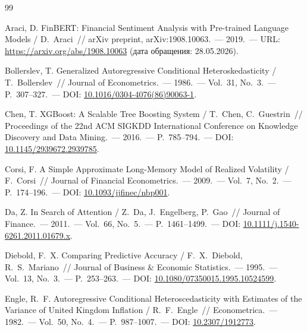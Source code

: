 \renewcommand{\refname}{Список использованных источников}

\begin{thebibliography}{99}

Araci, D.
FinBERT: Financial Sentiment Analysis with Pre-trained Language Models /
D.~Araci~// arXiv preprint, arXiv:1908.10063.~--- 2019.~---
URL: \url{https://arxiv.org/abs/1908.10063}
(дата обращения: 28.05.2026).

Bollerslev, T.
Generalized Autoregressive Conditional Heteroskedasticity /
T.~Bollerslev~// Journal of Econometrics.~--- 1986.~---
Vol.~31, No.~3.~--- P.~307--327.~---
DOI: \href{https://doi.org/10.1016/0304-4076(86)90063-1}{10.1016/0304-4076(86)90063-1}.

Chen, T.
XGBoost: A Scalable Tree Boosting System /
T.~Chen, C.~Guestrin~//
Proceedings of the 22nd ACM SIGKDD International Conference
on Knowledge Discovery and Data Mining.~--- 2016.~--- P.~785--794.~---
DOI: \href{https://doi.org/10.1145/2939672.2939785}{10.1145/2939672.2939785}.

Corsi, F.
A Simple Approximate Long-Memory Model of Realized Volatility /
F.~Corsi~// Journal of Financial Econometrics.~--- 2009.~---
Vol.~7, No.~2.~--- P.~174--196.~---
DOI: \href{https://doi.org/10.1093/jjfinec/nbp001}{10.1093/jjfinec/nbp001}.

Da, Z.
In Search of Attention /
Z.~Da, J.~Engelberg, P.~Gao~// Journal of Finance.~--- 2011.~---
Vol.~66, No.~5.~--- P.~1461--1499.~---
DOI: \href{https://doi.org/10.1111/j.1540-6261.2011.01679.x}{10.1111/j.1540-6261.2011.01679.x}.

Diebold, F.~X.
Comparing Predictive Accuracy /
F.~X.~Diebold, R.~S.~Mariano~//
Journal of Business \& Economic Statistics.~--- 1995.~---
Vol.~13, No.~3.~--- P.~253--263.~---
DOI: \href{https://doi.org/10.1080/07350015.1995.10524599}{10.1080/07350015.1995.10524599}.

Engle, R.~F.
Autoregressive Conditional Heteroscedasticity with Estimates of the
Variance of United Kingdom Inflation /
R.~F.~Engle~// Econometrica.~--- 1982.~---
Vol.~50, No.~4.~--- P.~987--1007.~---
DOI: \href{https://doi.org/10.2307/1912773}{10.2307/1912773}.


\end{thebibliography}
